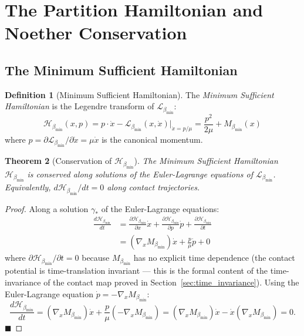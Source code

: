 \documentclass[11pt,twocolumn,a4paper]{article}
\theoremstyle{plain}
\newtheorem{theorem}{Theorem}[section]
\theoremstyle{definition}
\newtheorem{definition}[theorem]{Definition}
\theoremstyle{remark}
\newcommand{\bmin}{\beta_{\min}}
\newcommand{\Lmin}{\mathcal{L}_{\bmin}}
\newcommand{\Hmin}{\mathcal{H}_{\bmin}}
\renewcommand{\qed}{\hfill$\blacksquare$}
\begin{document}
\section{The Partition Hamiltonian and Noether Conservation}
\label{sec:hamiltonian}

\subsection{The Minimum Sufficient Hamiltonian}

\begin{definition}[Minimum Sufficient Hamiltonian]
\label{def:hamiltonian}
The \emph{Minimum Sufficient Hamiltonian} is the Legendre transform of $\Lmin$:
\[
  \Hmin(x, p) = p\cdot\dot{x} - \Lmin(x, \dot{x})\big|_{\dot{x} = p/\mu}
              = \frac{p^2}{2\mu} + M_{\bmin}(x)
\]
where $p = \partial\Lmin/\partial\dot{x} = \mu\dot{x}$ is the canonical
momentum.
\end{definition}

\begin{theorem}[Conservation of $\Hmin$]
\label{thm:conservation}
The Minimum Sufficient Hamiltonian $\Hmin$ is conserved along solutions of the
Euler-Lagrange equations of $\Lmin$. Equivalently, $d\Hmin/dt = 0$ along
contact trajectories.
\end{theorem}

\begin{proof}
Along a solution $\gamma_*$ of the Euler-Lagrange equations:
\begin{align*}
  \frac{d\Hmin}{dt} &= \frac{\partial\Hmin}{\partial x}\dot{x}
                      + \frac{\partial\Hmin}{\partial p}\dot{p}
                      + \frac{\partial\Hmin}{\partial t} \\
  &= (\nabla_x M_{\bmin})\dot{x} + \frac{p}{\mu}\dot{p} + 0
\end{align*}
where $\partial\Hmin/\partial t = 0$ because $M_{\bmin}$ has no explicit time
dependence (the contact potential is time-translation invariant --- this is
the formal content of the time-invariance of the contact map proved in
Section~\ref{sec:time_invariance}). Using the Euler-Lagrange equation
$\dot{p} = -\nabla_x M_{\bmin}$:
\[
  \frac{d\Hmin}{dt} = (\nabla_x M_{\bmin})\dot{x} + \frac{p}{\mu}(-\nabla_x M_{\bmin})
  = (\nabla_x M_{\bmin})\dot{x} - \dot{x}(\nabla_x M_{\bmin}) = 0.
\]
\qed
\end{proof}
\end{document}
